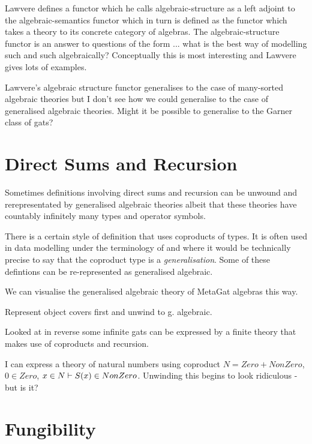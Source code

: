 \documentclass[10pt,a4paper]{article}
\theoremstyle{remark}
\begin{document}
\note
Lawvere defines a functor which he calls algebraic-structure as a  left adjoint  to the algebraic-semantics functor which in turn is defined as the functor which takes a theory to its concrete category of algebras. 
The algebraic-structure functor is an answer to questions of the form ... what is the best way of modelling such and such algebraically? 
Conceptually this is most interesting and Lawvere gives lots of examples. 

Lawvere's algebraic structure functor generalises to the case of many-sorted algebraic theories but I don't see how we could generalise to the case of generalised algebraic theories.
Might it be possible to generalise to the Garner class of gats? 

\section{Direct Sums and Recursion}

\note Sometimes definitions involving direct sums and recursion can be unwound and rerepresentated by
generalised algebraic theories albeit that these theories have countably infinitely many types and operator symbols.
 
There is a certain style of definition that uses coproducts of types. It is often used in data modelling 
under the terminology of  and where it would be technically precise to say that the
coproduct type is a \textit{generalisation}. Some of these defintions can be re-represented as generalised algebraic.

We can visualise the generalised algebraic theory of MetaGat algebras this way.

Represent object covers first and unwind to g. algebraic. \tbd

Looked at in reverse some infinite gats can be expressed by a finite theory that makes use of coproducts and recursion.
  
I can express a theory of natural numbers using coproduct $N = Zero + NonZero$,
$0 \in Zero$, $x \in N \vdash S(x) \in NonZero$.   Unwinding this begins to look ridiculous - but is it?


\section{Fungibility} 




%

 

\end{document}

